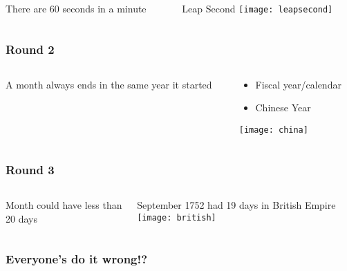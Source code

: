 \documentclass[aspectratio=169, 15pt,usenames,dvipsnames]{beamer}
\begin{document}
{	\begin{gdblank}
		\begin{columns}
			\begin{column}{0.70\textwidth}
				\centering
				\LARGE There are 60 seconds in a minute 
				\pause     
			\end{column}
			\begin{column}{0.3\textwidth}
				\large\centering Leap Second
				\vskip0.5cm
				\texttt{[image: leapsecond]}
			\end{column}
		\end{columns}
	\end{gdblank}
	\begin{gdblank}
		\frametitle{Round 2}    
		\begin{columns}
			\begin{column}{0.70\textwidth}
				\centering
				\LARGE A month always ends in the same year it started
				\pause     
			\end{column}
			\begin{column}{0.3\textwidth}
				\large\centering 
				\begin{itemize}
					\item Fiscal year/calendar
					\item Chinese Year
				\end{itemize}
				\vskip0.5cm
				\texttt{[image: china]}
			\end{column}
		\end{columns}
	\end{gdblank} 
	\begin{gdblank}
		\frametitle{Round 3}    
		\begin{columns}
			\begin{column}{0.70\textwidth}
				\centering
				\LARGE Month could have less than 20 days
				\pause     
			\end{column}
			\begin{column}{0.3\textwidth}
				\large\centering  September 1752 had 19 days in British Empire
				\vskip0.5cm
				\texttt{[image: british]}
			\end{column}
		\end{columns}
	\end{gdblank} 
	\begin{gdblank}
		\frametitle{Everyone's do it wrong!?}
		\centering{\fontsize{140pt}{150pt}\selectfont\bf ?}
	\end{gdblank}   
	\begin{gdblank}
		\begin{columns}

\end{columns}
\end{gdblank}}
\end{document}
